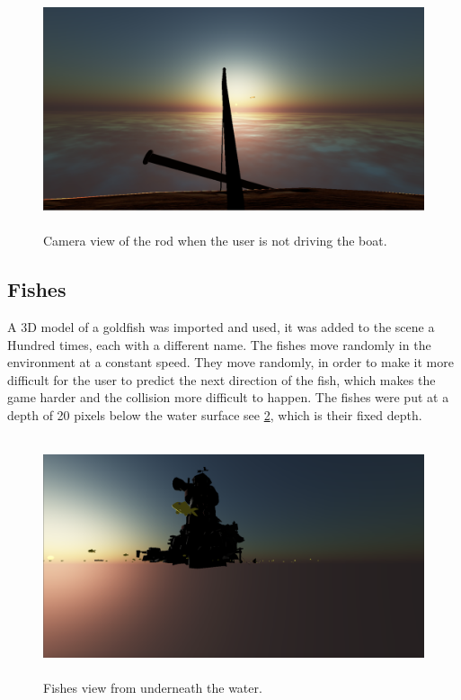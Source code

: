 \documentclass[paper=a4, fontsize=11pt]{scrartcl} %
\numberwithin{equation}{section} %
\numberwithin{figure}{section} %
\numberwithin{table}{section} %
\begin{document}
\begin{figure}[!ht]
\centering
\includegraphics[width=15cm, height=7cm]{images/pulledrod.png}
\caption{Camera view of the rod when the user is not driving the boat.}
\label{Urod}
\end{figure}
\newpage
\subsection{Fishes}

A 3D model of a goldfish was imported and used, it was added to the scene a Hundred times, each with a different name. The fishes move randomly in the environment at a constant speed. They move randomly, in order to make it more difficult for the user to predict the next direction of the fish, which makes the game harder and the collision more difficult to happen. The fishes were put at a depth of 20 pixels below the water surface see \ref{fishes}, which is their fixed depth. 

\begin{figure}[!ht]
\centering
\includegraphics[width=15cm, height=7cm]{images/fishes.png}
\caption{Fishes view from underneath the water.}
\label{fishes}
\end{figure}
\newpage
\end{document}
